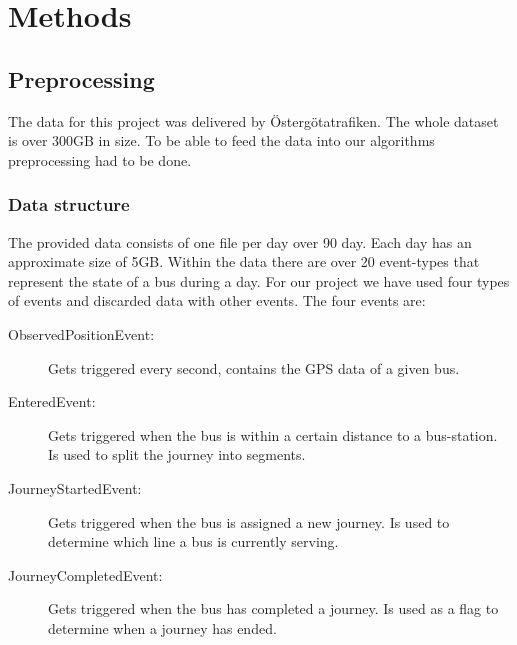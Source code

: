 
\chapter{Methods}
\label{cha:method}

\section{Preprocessing}
The data for this project was delivered by Östergötatrafiken. The whole dataset is over 300GB in size. To be able to feed the data into our algorithms preprocessing had to be done. 

\subsection{Data structure}
The provided data consists of one file per day over 90 day. Each day has an approximate size of 5GB. Within the data there are over 20 event-types that represent the state of a bus during a day. For our project we have used four types of events and discarded data with other events. The four events are:\\
\begin{description}
\item[ObservedPositionEvent:] Gets triggered every second, contains the GPS data of a given bus.
\item[EnteredEvent:] Gets triggered when the bus is within a certain distance to a bus-station. Is used to split the journey into segments.
\item[JourneyStartedEvent:] Gets triggered when the bus is assigned a new journey. Is used to determine which line a bus is currently serving.
\item[JourneyCompletedEvent:] Gets triggered when the bus has completed a journey. Is used as a flag to determine when a journey has ended.
\end{description}

